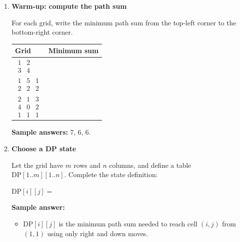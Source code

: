 \documentclass[11pt]{article}
\begin{document}
\begin{enumerate}[leftmargin=0pt, itemindent=1.7em, itemsep=1.2em]

\item \textbf{Warm-up: compute the path sum}

For each grid, write the minimum path sum from the top-left corner to the bottom-right corner.

\vspace{0.25cm}
\begin{center}
\renewcommand{\arraystretch}{1.6}
\begin{tabular}{|>{\raggedright\arraybackslash}m{2.2in}|>{\centering\arraybackslash}m{1.1in}|}
\hline
Grid & Minimum sum \\\hline
$\begin{array}{cc}1 & 2 \\ 3 & 4\end{array}$ & \\\hline
$\begin{array}{ccc}1 & 5 & 1 \\ 2 & 2 & 2\end{array}$ & \\\hline
$\begin{array}{ccc}2 & 1 & 3 \\ 4 & 0 & 2 \\ 1 & 1 & 1\end{array}$ & \\\hline
\end{tabular}
\end{center}

\vspace{0.8cm}

\ifanswers
\textbf{Sample answers:} 7, 6, 6.
\fi

\item \textbf{Choose a DP state}

Let the grid have $m$ rows and $n$ columns, and define a table $\mathrm{DP}[1..m][1..n]$.
Complete the state definition:

\vspace{0.2cm}
\hspace*{1em}$\mathrm{DP}[i][j] =$ \hrulefill

\vspace{2.0cm}

\ifanswers
\textbf{Sample answer:}
\begin{itemize}
	\item $\mathrm{DP}[i][j]$ is the minimum path sum needed to reach cell $(i,j)$ from $(1,1)$ using only right and down moves.
\end{itemize}
\fi


\end{enumerate}
\end{document}
